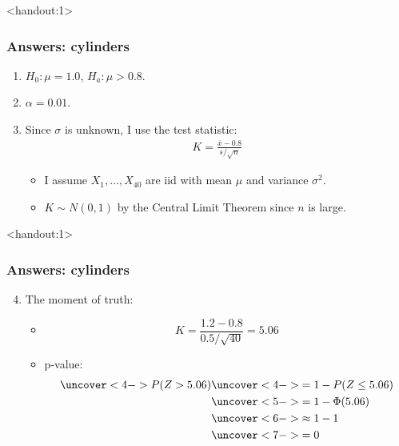 \documentclass[handout]{beamer}\usepackage{graphicx, color}
\newcommand{\answers}{1}
\providecommand{\ov}[1]{\overline{#1}}
\numberwithin{equation}{section}
\begin{document}
\begin{frame}<handout:\answers>
\frametitle{Answers: cylinders}
\begin{enumerate}[1. ]
\item $H_0: \mu = 1.0$, $H_a: \mu > 0.8$.
\pause \item $\alpha = 0.01$.
\pause \item Since $\sigma$ is unknown, I use the test statistic:
\begin{align*}
K = \frac{\ov{x} - 0.8}{s/\sqrt{n}}
\end{align*}
\begin{itemize}
\pause \item I assume $X_1, \ldots, X_{40}$ are iid with mean $\mu$ and variance $\sigma^2$.
\pause \item $K \sim N(0,1)$ by the Central Limit Theorem since $n$ is large.
\end{itemize}
\end{enumerate}
\end{frame}

\begin{frame}<handout:\answers>
\frametitle{Answers: cylinders}
\begin{enumerate}
\setcounter{enumi}{3}
\item The moment of truth:
\begin{itemize}
\pause \item \[K = \frac{1.2 -  0.8}{0.5/\sqrt{40}} = 5.06 \]
\pause \item  p-value:
\begin{align*}
\uncover<4->{P(Z > 5.06)} & \uncover<4->{= 1 - P(Z \le 5.06)} \\
&\uncover<5->{= 1 - \Phi(5.06)} \\
&\uncover<6->{\approx 1 - 1} \\
&\uncover<7->{= 0}
\end{align*}
\end{itemize}
\end{enumerate}
\end{frame}
\end{document}

